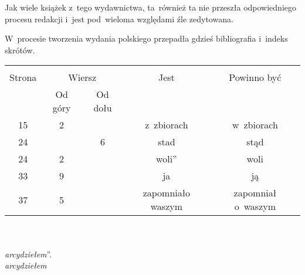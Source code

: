 \documentclass[a4paper,11pt]{article}
\begin{document}
\vspace{\spaceThree}






\start Jak wiele książek z~tego wydawnictwa, ta~również ta nie
przeszła odpowiedniego procesu redakcji i~jest pod~wieloma względami
źle zedytowana.

\vspace{\spaceFour}


\start W~procesie tworzenia wydania polskiego przepadła gdzieś
bibliografia i~indeks skrótów.

\begin{center}
  \begin{tabular}{|c|c|c|c|c|}
    \hline
    & \multicolumn{2}{c|}{} & & \\
    Strona & \multicolumn{2}{c|}{Wiersz} & Jest
                              & Powinno być \\ \cline{2-3}
    & Od góry & Od dołu & & \\
    \hline
    15  &  2 & & z~zbiorach & w~zbiorach \\
    24  & &  6 & stad & stąd \\
    24  &  2 & & woli'' & woli \\
    33  &  9 & & ja & ją \\
    37  &  5 & & zapomniało waszym & zapomniał o~waszym \\
    \hline
  \end{tabular}
\end{center}
\noindent\\
 \\
\Jest  \emph{arcydziełem}''. \\
\Powin \emph{arcydziełem} \\

\vspace{\spaceTwo}





\end{document}
